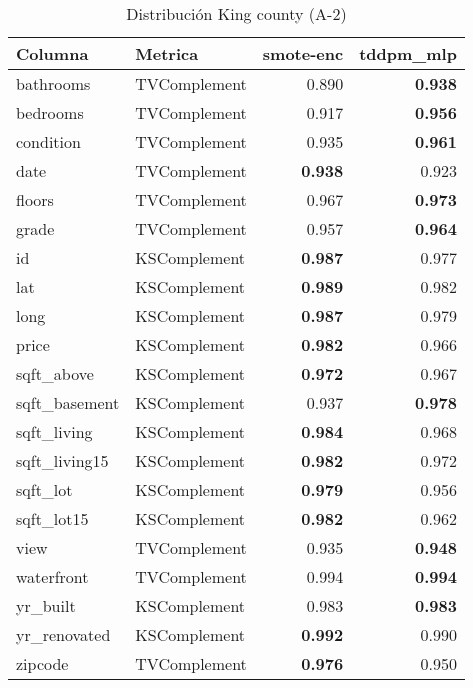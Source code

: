 \begin{table}[H]
\centering
\caption{Distribución King county (A-2)}
\label{table-shape-king county-a-2}
\begin{tabular}{|l|l|r|r|}
\hline
\rowcolor[gray]{0.8}
Columna & Metrica & smote-enc & tddpm\_mlp \\
\hline bathrooms & TVComplement & 0.890 & \bfseries 0.938 \\
\hline bedrooms & TVComplement & 0.917 & \bfseries 0.956 \\
\hline condition & TVComplement & 0.935 & \bfseries 0.961 \\
\hline date & TVComplement & \bfseries 0.938 & 0.923 \\
\hline floors & TVComplement & 0.967 & \bfseries 0.973 \\
\hline grade & TVComplement & 0.957 & \bfseries 0.964 \\
\hline id & KSComplement & \bfseries 0.987 & 0.977 \\
\hline lat & KSComplement & \bfseries 0.989 & 0.982 \\
\hline long & KSComplement & \bfseries 0.987 & 0.979 \\
\hline price & KSComplement & \bfseries 0.982 & 0.966 \\
\hline sqft\_above & KSComplement & \bfseries 0.972 & 0.967 \\
\hline sqft\_basement & KSComplement & 0.937 & \bfseries 0.978 \\
\hline sqft\_living & KSComplement & \bfseries 0.984 & 0.968 \\
\hline sqft\_living15 & KSComplement & \bfseries 0.982 & 0.972 \\
\hline sqft\_lot & KSComplement & \bfseries 0.979 & 0.956 \\
\hline sqft\_lot15 & KSComplement & \bfseries 0.982 & 0.962 \\
\hline view & TVComplement & 0.935 & \bfseries 0.948 \\
\hline waterfront & TVComplement & 0.994 & \bfseries 0.994 \\
\hline yr\_built & KSComplement & 0.983 & \bfseries 0.983 \\
\hline yr\_renovated & KSComplement & \bfseries 0.992 & 0.990 \\
\hline zipcode & TVComplement & \bfseries 0.976 & 0.950 \\
\hline
\end{tabular}
\end{table}
